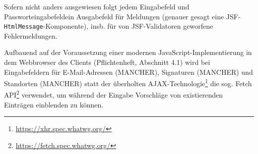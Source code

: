\documentclass{article}
\begin{document}

\newcommand{\PUB}{jeder}
\newcommand{\ANO}{Anon.}
\newcommand{\USR}{Nutzer}
\newcommand{\BIB}{Mitarbeiter}
\newcommand{\ADM}{Admin.}

\newcommand{\component}[2]{\subsubsection{#1 (\texttt{#2})}}
\newcommand{\page}[2]{
    \subsubsection{#1}
    \paragraph*{Dateipfad} \texttt{#2.xhtml}
}

\newcommand{\Javadoc}{\paragraph*{Javadoc}}

\newcommand{\BTN}{Knopf}
\newcommand{\LNK}{Hyperlink}
\newcommand{\INP}{Eingabefeld}
\newcommand{\PAS}{Passworteingabefeld}
\newcommand{\DRP}{Drop-Down-Liste}
\newcommand{\CHK}{Checkbox}
\newcommand{\OUT}{Ausgabefeld}
\newcommand{\LST}{Paginierte Liste}

\newenvironment{controls}
{
    \begin{table}[H]
        \centering
        \begin{tabular}{ p{7em} p{25em} p{7em} }
            \toprule
            \textbf{Typ} & \textbf{Beschreibung} & \textbf{Sichtbarkeit}\\
            \midrule
        }
        {
            \bottomrule
        \end{tabular}
    \end{table}
}

Sofern nicht anders ausgewiesen folgt jedem Eingabefeld und \PAS ein Ausgabefeld für Meldungen (genauer gesagt eine JSF-\texttt{HtmlMessage}-Komponente), insb. für von JSF-Validatoren geworfene Fehlermeldungen.

Aufbauend auf der Voraussetzung einer modernen JavaScript-Implementierung in dem Webbrowser des Clients (Pflichtenheft, Abschnitt 4.1) wird bei Eingabefeldern für E-Mail-Adressen (MANCHER), Signaturen (MANCHER) und Standorten (MANCHER) statt der überholten AJAX-Technologie\footnote{\url{https://xhr.spec.whatwg.org/}} die sog. Fetch API\footnote{\url{https://fetch.spec.whatwg.org/}} verwendet, um während der Eingabe Vorschläge von existierenden Einträgen einblenden zu können.
\end{document}
